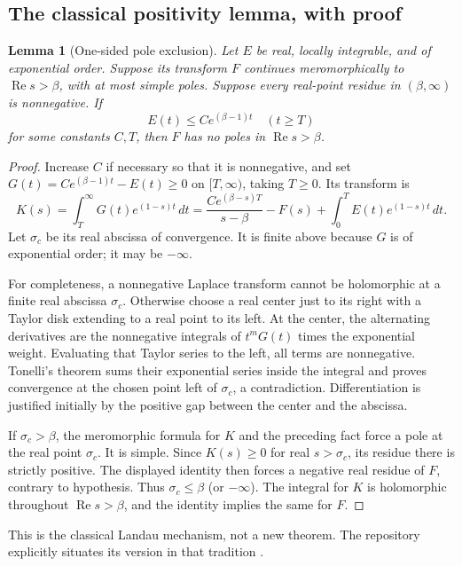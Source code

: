 \documentclass[11pt,a4paper]{article}
\newtheorem{lemma}[theorem]{Lemma}
\theoremstyle{definition}\newtheorem{definition}[theorem]{Definition}
\theoremstyle{remark}\newtheorem{remark}[theorem]{Remark}
\newcommand{\Rea}{\operatorname{Re}}
\begin{document}
\subsection{The classical positivity lemma, with proof}
\begin{lemma}[One-sided pole exclusion]\label{lem:landau}
Let $E$ be real, locally integrable, and of exponential order. Suppose its transform $F$ continues meromorphically to $\Rea s>\beta$, with at most simple poles. Suppose every real-point residue in $(\beta,\infty)$ is nonnegative. If
\[
E(t)\le C e^{(\beta-1)t}\quad(t\ge T)
\]
for some constants $C,T$, then $F$ has no poles in $\Rea s>\beta$.
\end{lemma}
\begin{proof}
Increase $C$ if necessary so that it is nonnegative, and set
$G(t)=Ce^{(\beta-1)t}-E(t)\ge0$ on $[T,\infty)$, taking $T\ge0$.
Its transform is
\[
K(s)=\int_T^\infty G(t)e^{(1-s)t}\,dt
=\frac{Ce^{(\beta-s)T}}{s-\beta}-F(s)
+\int_0^T E(t)e^{(1-s)t}\,dt.
\]
Let $\sigma_c$ be its real abscissa of convergence. It is finite above because $G$ is of exponential order; it may be $-\infty$.

For completeness, a nonnegative Laplace transform cannot be holomorphic at a finite real abscissa $\sigma_c$. Otherwise choose a real center just to its right with a Taylor disk extending to a real point to its left. At the center, the alternating derivatives are the nonnegative integrals of $t^mG(t)$ times the exponential weight. Evaluating that Taylor series to the left, all terms are nonnegative. Tonelli's theorem sums their exponential series inside the integral and proves convergence at the chosen point left of $\sigma_c$, a contradiction. Differentiation is justified initially by the positive gap between the center and the abscissa.

If $\sigma_c>\beta$, the meromorphic formula for $K$ and the preceding fact force a pole at the real point $\sigma_c$. It is simple. Since $K(s)\ge0$ for real $s>\sigma_c$, its residue there is strictly positive. The displayed identity then forces a negative real residue of $F$, contrary to hypothesis. Thus $\sigma_c\le\beta$ (or $-\infty$). The integral for $K$ is holomorphic throughout $\Rea s>\beta$, and the identity implies the same for $F$.
\end{proof}
This is the classical Landau mechanism, not a new theorem. The repository explicitly situates its version in that tradition \cite{landau}.
\end{document}
